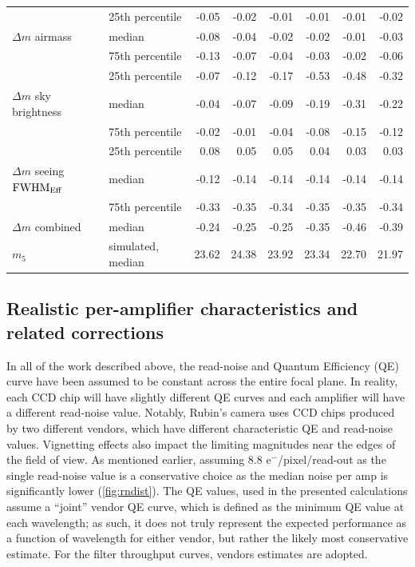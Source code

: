 \documentclass[PST,authoryear,toc]{lsstdoc}
\newcommand{\mf}{\ensuremath{m_5}}
\newcommand{\fwhme}{\ensuremath{{\rm FWHM}_\mathrm{Eff}}}
\begin{document}
\begin{table}
\begin{tabular}{llrrrrrr}
\hline
\hline
 &25th percentile       &   -0.05 &   -0.02 &   -0.01 &   -0.01 &   -0.01 &   -0.02 \\
$\Delta m$ airmass &median                &   -0.08 &   -0.04 &   -0.02 &   -0.02 &   -0.01 &   -0.03 \\
&75th percentile       &   -0.13 &   -0.07 &   -0.04 &   -0.03 &   -0.02 &   -0.06 \\
\hline
 &25th percentile &   -0.07 &   -0.12 &   -0.17 &   -0.53 &   -0.48 &   -0.32 \\
$\Delta m$ sky brightness& median          &   -0.04 &   -0.07 &   -0.09 &   -0.19 &   -0.31 &   -0.22 \\
 &75th percentile &   -0.02 &   -0.01 &   -0.04 &   -0.08 &   -0.15 &   -0.12 \\
\hline
&25th percentile &  0.08 &  0.05 &  0.05 &  0.04 &  0.03 &  0.03 \\
$\Delta m$ seeing \fwhme &median          &   -0.12 &   -0.14 &   -0.14 &   -0.14 &   -0.14 &   -0.14 \\
 &75th percentile &   -0.33 &   -0.35 &   -0.34 &   -0.35 &   -0.35 &   -0.34 \\
 \hline
 $\Delta m$ {combined} &median          &   -0.24 &   -0.25 &   -0.25 &   -0.35 &   -0.46 &   -0.39 \\

\hline
\hline
\mf\ & simulated, median                      &  23.62 &  24.38 &  23.92 &  23.34 &  22.70 &  21.97 \\
\hline

\hline
\end{tabular}
\end{table}

 
 \FloatBarrier


\subsection{Realistic per-amplifier characteristics and related corrections}\label{per-amp}
In all of the work described above, the read-noise and Quantum Efficiency (QE) curve have been assumed to be constant across the entire focal plane. In reality, each CCD chip will have slightly different QE curves and each amplifier will have a different read-noise value. Notably, Rubin's camera uses CCD chips produced by two different vendors, which have different characteristic QE and read-noise values. Vignetting effects also impact the limiting magnitudes near the edges of the field of view.  As mentioned earlier, assuming 8.8 e$^-$/pixel/read-out as the single read-noise value is a conservative choice as the median noise per amp is significantly lower (\autoref{fig:rndist}). The QE values, used in the presented calculations assume a ``joint'' vendor QE curve, which is defined as the minimum QE value at each wavelength; as such, it does not truly represent the expected performance as a function of wavelength for either vendor, but rather the likely most conservative estimate. For the filter throughput curves, vendors estimates are adopted.
\end{document}
